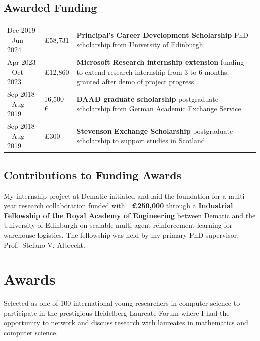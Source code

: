 \documentclass[a4paper,12pt]{article}
\begin{document}
\subsection{Awarded Funding}
\begin{tabularx}{\linewidth}{@{}l l X@{}}
    Dec 2019 - Jun 2024 & \pounds 58,731 & \textbf{Principal's Career Development Scholarship} \newline PhD scholarship from University of Edinburgh \\
    Apr 2023 - Oct 2023 & \pounds 12,860 & \textbf{Microsoft Research internship extension} \newline funding to extend research internship from 3 to 6 months; granted after demo of project progress\\
    Sep 2018 - Aug 2019 & 16,500 \euro & \textbf{DAAD graduate scholarship} \newline postgraduate scholarship from German Academic Exchange Service\\
    Sep 2018 - Aug 2019 & \pounds 300 & \textbf{Stevenson Exchange Scholarship} \newline postgraduate scholarship to support studies in Scotland
\end{tabularx}
\expspace

\subsection{Contributions to Funding Awards}
\begin{expblock}
    My internship project at Dematic initiated and laid the foundation for a multi-year research collaboration funded with \textbf{~\pounds 250,000} through a \textbf{Industrial Fellowship of the Royal Academy of Engineering} between Dematic and the University of Edinburgh on scalable multi-agent reinforcement learning for warehouse logistics. The fellowship was held by my primary PhD supervisor, Prof.\ Stefano V. Albrecht.
\end{expblock}


\section{Awards}
\begin{expblock}
    Selected as one of 100 international young researchers in computer science to participate in the prestigious Heidelberg Laureate Forum where I had the opportunity to network and discuss research with laureates in mathematics and computer science.%
\end{expblock}
\end{document}
